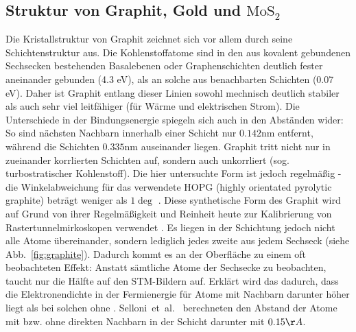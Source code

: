 \subsection{Struktur von Graphit, Gold und $\mathrm{MoS_2}$}
Die Kristallstruktur von Graphit zeichnet sich vor allem durch seine Schichtenstruktur 
aus. Die Kohlenstoffatome sind in den aus kovalent gebundenen Sechsecken bestehenden 
Basalebenen oder Graphenschichten deutlich fester aneinander gebunden (4.3 eV), als 
an solche aus benachbarten Schichten (0.07 eV). Daher ist Graphit entlang dieser Linien 
sowohl mechnisch deutlich stabiler als auch sehr viel leitfähiger (für Wärme und 
elektrischen Strom). Die Unterschiede in der Bindungsenergie spiegeln sich auch in den 
Abständen wider: So sind nächsten Nachbarn innerhalb einer Schicht nur $0.142\mathrm{nm}$ 
entfernt, während die Schichten $0.335\mathrm{nm}$ auseinander liegen.  
Graphit tritt nicht nur in zueinander korrlierten Schichten auf, 
sondern auch unkorrliert (sog. turbostratischer Kohlenstoff). Die hier untersuchte Form 
ist jedoch regelmäßig - die Winkelabweichung für das verwendete HOPG (highly orientated 
pyrolytic graphite) beträgt weniger als $1 \deg$ \cite{mcnaught2000iupac}. Diese 
synthetische Form des Graphit wird auf Grund von ihrer Regelmäßigkeit und Reinheit 
heute zur Kalibrierung von Rastertunnelmirkoskopen verwendet \cite{lapshin1998automatic}. 
Es liegen in der Schichtung jedoch nicht alle Atome übereinander, sondern lediglich 
jedes zweite aus jedem Sechseck (siehe Abb.~\ref{fig:graphite}). 
Dadurch kommt es an der Oberfläche zu einem oft beobachteten 
Effekt: Anstatt sämtliche Atome der Sechsecke zu beobachten, taucht nur die Hälfte auf 
den STM-Bildern auf. Erklärt wird das dadurch, dass die Elektronendichte in der 
Fermienergie für Atome mit Nachbarn darunter höher liegt als bei solchen ohne
\cite{zeinalipour2008new}. Selloni~et~al.~\cite{Sellino1985} berechneten den Abstand 
der Atome mit bzw. ohne direkten Nachbarn in der Schicht darunter mit $0.15 \AA$. 

